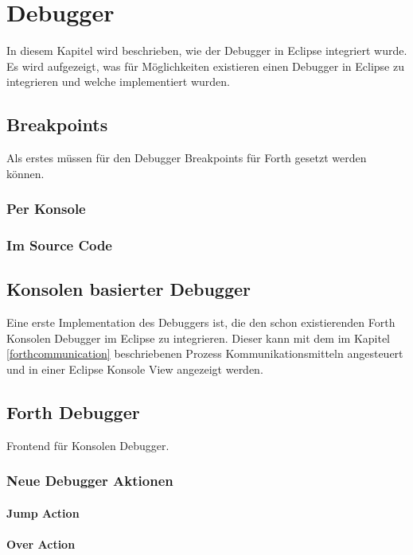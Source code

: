 \chapter{Debugger}

In diesem Kapitel wird beschrieben, wie der Debugger in Eclipse integriert wurde. Es wird aufgezeigt, was für Möglichkeiten existieren einen Debugger in Eclipse zu integrieren und welche implementiert wurden.

\section{Breakpoints}
Als erstes müssen für den Debugger Breakpoints für Forth gesetzt werden können.

\subsection{Per Konsole}

\subsection{Im Source Code}


\section{Konsolen basierter Debugger}

Eine erste Implementation des Debuggers ist, die den schon existierenden Forth Konsolen Debugger im Eclipse zu integrieren. Dieser kann mit dem im Kapitel \ref{forthcommunication} beschriebenen Prozess Kommunikationsmitteln angesteuert und in einer Eclipse Konsole View angezeigt werden.

\section{Forth Debugger}

Frontend für Konsolen Debugger.

\subsection{Neue Debugger Aktionen}

\subsubsection{Jump Action}

\subsubsection{Over Action}

